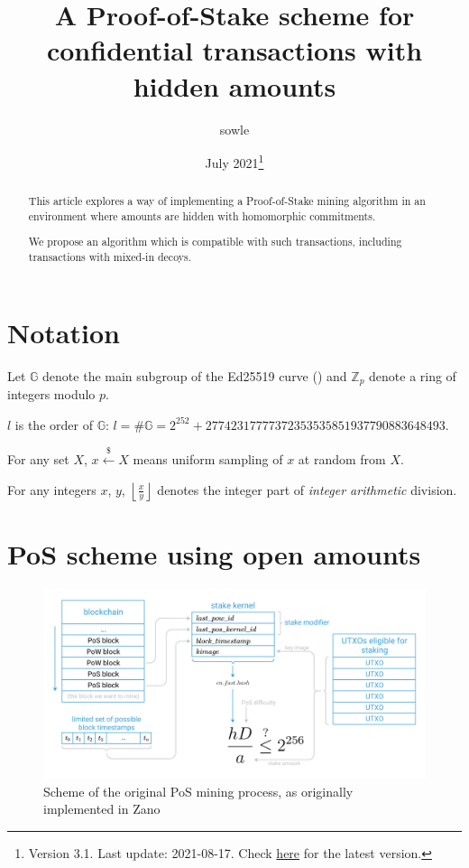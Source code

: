 \documentclass{article}
\title{\huge{\textbf{A Proof-of-Stake scheme for confidential transactions with hidden amounts}}}
\author{\large{sowle}}
\affil{\small{Zano project \\ \texttt{val@zano.org} \\ \url{https://zano.org}}}
\date{\small{July 2021\footnote{Version 3.1. Last update: 2021-08-17. Check \href{https://github.com/hyle-team/docs/tree/master/PoS/PoS_with_HA}{here} for the latest version.}}}
\newcommand{\floor}[1]{\left\lfloor #1 \right\rfloor}
\numberwithin{figure}{section}
\begin{document}
\maketitle

\begin{abstract}
This article explores a way of implementing a Proof-of-Stake mining algorithm in an environment where amounts are hidden with homomorphic commitments.

We propose an algorithm which is compatible with such transactions, including transactions with mixed-in decoys.
\end{abstract}

\section{Notation}
Let $\mathbb{G}$ denote the main subgroup of the Ed25519 curve (\cite{ed25519_site}) and $\mathbb{Z}_p$ denote a ring of integers modulo $p$.

$l$ is the order of $\mathbb{G}$: $l = \#\mathbb{G} = 2^{252} + 27742317777372353535851937790883648493$.

For  any  set $X$, $x \stackrel{\$}{\leftarrow} X$ means uniform  sampling of $x$ at random from $X$. 

For any integers $x$, $y$, $\floor{\frac{x}{y}}$ denotes the integer part of \textit{integer arithmetic} division.


\section{PoS scheme using open amounts} \label{sec_open_amounts}

\begin{figure}[ht!]
\centering
\includegraphics[scale=0.665]{fig_1.png}
\caption{Scheme of the original PoS mining process, as originally implemented in Zano}
\label{fig:1.1}
\end{figure}
\end{document}
